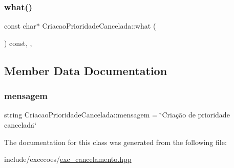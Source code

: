 \subsubsection{\texorpdfstring{what()}{what()}}
{\footnotesize\ttfamily const char$\ast$ Criacao\+Prioridade\+Cancelada\+::what (\begin{DoxyParamCaption}{ }\end{DoxyParamCaption}) const\hspace{0.3cm}{\ttfamily [inline]}, {\ttfamily [override]}, {\ttfamily [noexcept]}}



\subsection{Member Data Documentation}
\mbox{\label{classCriacaoPrioridadeCancelada_aec9dedf305887e4227ed1af5cf26b49c}} 
\subsubsection{\texorpdfstring{mensagem}{mensagem}}
{\footnotesize\ttfamily string Criacao\+Prioridade\+Cancelada\+::mensagem = \char`\"{}Criação de prioridade cancelada\char`\"{}\hspace{0.3cm}{\ttfamily [private]}}



The documentation for this class was generated from the following file\+:\begin{DoxyCompactItemize}
\item 
include/excecoes/\hyperlink{exc__cancelamento_8hpp}{exc\+\_\+cancelamento.\+hpp}\end{DoxyCompactItemize}
